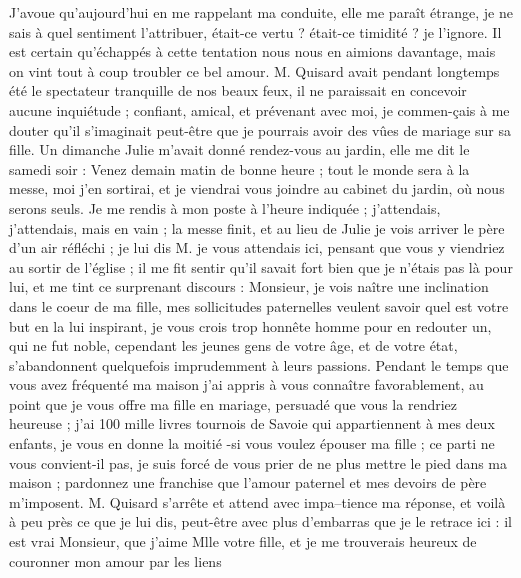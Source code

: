 \documentclass[12pt]{article}
\begin{document}
 J’avoue qu’aujourd’hui en me rappelant ma conduite, elle
me paraît étrange, je ne sais à quel sentiment l’attribuer, était-ce vertu ? était-ce timidité ? je
l’ignore. Il est certain qu’échappés à cette tentation nous nous en aimions davantage, mais on vint
tout à coup troubler ce bel amour. M. Quisard avait pendant longtemps été le spectateur tranquille
de nos beaux feux, il ne paraissait en concevoir aucune inquiétude ; confiant, amical, et prévenant
avec moi, je commen-çais à me douter qu’il s’imaginait peut-être que je pourrais avoir des vûes de
mariage sur sa fille. Un dimanche Julie m’avait donné rendez-vous au jardin, elle me dit le samedi
soir : Venez demain matin de bonne heure ; tout le monde sera à la messe, moi j’en sortirai, et je
viendrai vous joindre au cabinet du jardin, où nous serons seuls. Je me rendis à mon poste à l’heure
indiquée ; j’attendais, j’attendais, mais en vain ; la messe finit, et au lieu de Julie je vois
arriver le père d’un air réfléchi ; je lui dis M. je vous attendais ici, pensant que vous y
viendriez au sortir de l’église ; il me fit sentir qu’il savait fort bien que je n’étais pas là pour
lui, et me tint ce surprenant discours : Monsieur, je vois naître une inclination dans le coeur de
ma fille, mes sollicitudes paternelles veulent savoir quel est votre but en la lui inspirant, je
vous crois trop honnête homme pour en redouter un, qui ne fut noble, cependant les jeunes gens de
votre âge, et de votre état, s’abandonnent quelquefois imprudemment à leurs passions. Pendant le
temps que vous avez fréquenté ma maison j’ai appris à vous connaître favorablement, au point que je
vous offre ma fille en mariage, persuadé que vous la rendriez heureuse ; j’ai 100 mille livres
tournois de Savoie qui appartiennent à mes deux enfants, je vous en donne la moitié -si vous voulez
épouser ma fille ; ce parti ne vous convient-il pas, je suis forcé de vous prier de ne plus mettre
le pied dans ma maison ; pardonnez une franchise que l’amour paternel et mes devoirs de père
m’imposent. M. Quisard s’arrête et attend avec impa–tience ma réponse, et voilà à peu près ce que je
lui dis, peut-être avec plus d’embarras que je le retrace ici : il est vrai Monsieur, que j’aime
Mlle votre fille, et je me trouverais heureux de couronner mon amour par les liens
\end{document}
